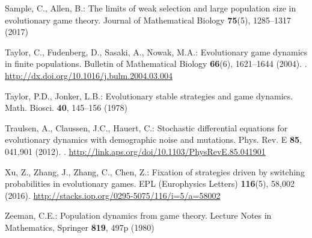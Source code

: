 \documentclass[12pt]{article}
\begin{document}
\begin{thebibliography}{10}
	Sample, C., Allen, B.: The limits of weak selection and large population size
	in evolutionary game theory.
	\newblock Journal of Mathematical Biology \textbf{75}(5), 1285--1317 (2017)
	
	Taylor, C., Fudenberg, D., Sasaki, A., Nowak, M.A.: Evolutionary game dynamics
	in finite populations.
	\newblock Bulletin of Mathematical Biology \textbf{66}(6), 1621--1644 (2004).
	\newblock {}.
	\newblock \urlprefix\url{http://dx.doi.org/10.1016/j.bulm.2004.03.004}
	
	Taylor, P.D., Jonker, L.B.: Evolutionary stable strategies and game dynamics.
	\newblock Math. Biosci. \textbf{40}, 145--156 (1978)
	
	Traulsen, A., Claussen, J.C., Hauert, C.: Stochastic differential equations for
	evolutionary dynamics with demographic noise and mutations.
	\newblock Phys. Rev. E \textbf{85}, 041,901 (2012).
	\newblock {}.
	\newblock \urlprefix\url{http://link.aps.org/doi/10.1103/PhysRevE.85.041901}
	
	Xu, Z., Zhang, J., Zhang, C., Chen, Z.: Fixation of strategies driven by
	switching probabilities in evolutionary games.
	\newblock EPL (Europhysics Letters) \textbf{116}(5), 58,002 (2016).
	\newblock \urlprefix\url{http://stacks.iop.org/0295-5075/116/i=5/a=58002}
	
	Zeeman, C.E.: Population dynamics from game theory.
	\newblock Lecture Notes in Mathematics, Springer \textbf{819}, 497p (1980)
	
\end{thebibliography}
\end{document}
